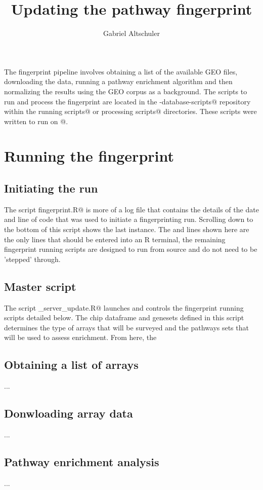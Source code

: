 \documentclass{article}
\begin{document}
\title{Updating the pathway fingerprint}
\author{Gabriel Altschuler}
\maketitle
The fingerprint pipeline involves obtaining a list of the available GEO files, downloading the data, running a pathway enrichment algorithm and then normalizing the results using the GEO corpus as a background. The scripts to run and process the fingerprint are located in the \verb@fingerprint-database-scripts@ repository within the \verb@Fingerprint running scripts@ or \verb@Fingerprint processing scripts@ directories. These scripts were written to run on @.
\section{Running the fingerprint}
\subsection{Initiating the run}
The script \verb@Updating fingerprint.R@ is more of a log file that contains the details of the date and line of code that was used to initiate a fingerprinting run. Scrolling down to the bottom of this script shows the last instance. The \verb@setwd@ and \verb@source@ lines shown here are the only lines that should be entered into an R terminal, the remaining fingerprint running scripts are designed to run from source and do not need to be 'stepped' through.
\subsection{Master script}
The script \verb@GEOsurvey_server_update.R@ launches and controls the fingerprint running scripts detailed below. The chip dataframe and genesets defined in this script determines the type of arrays that will be surveyed and the pathways sets that will be used to assess enrichment. From here, the 
\subsection{Obtaining a list of arrays}
...
\subsection{Donwloading array data}
...
\subsection{Pathway enrichment analysis}
...
\end{document}
